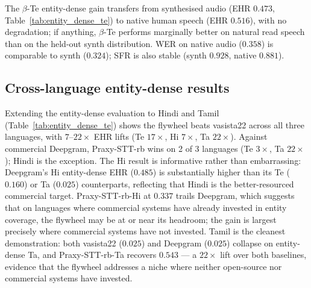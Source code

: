 \documentclass[conference,a4paper]{IEEEtran}
\begin{document}
\begin{table}[t]
\centering
\caption{Native human-recorded entity-dense Telugu sanity check ($n=20$). Bold = best per column. EHR/SFR higher is better; WER lower is better.}
\label{tab:native_sanity}
\end{table}

The $\beta$-Te entity-dense gain transfers from synthesised audio (EHR $0.473$, Table~\ref{tab:entity_dense_te}) to native human speech (EHR $0.516$), with no degradation; if anything, $\beta$-Te performs marginally better on natural read speech than on the held-out synth distribution. WER on native audio ($0.358$) is comparable to synth ($0.324$); SFR is also stable (synth $0.928$, native $0.881$).

\subsection{Cross-language entity-dense results}\label{sec:beta_xling}

Extending the entity-dense evaluation to Hindi and Tamil (Table~\ref{tab:entity_dense_te}) shows the flywheel beats vasista22 across all three languages, with $7$--$22\times$ EHR lifts (Te $17\times$, Hi $7\times$, Ta $22\times$). Against commercial Deepgram, Praxy-STT-rb wins on 2 of 3 languages (Te $3\times$, Ta $22\times$); Hindi is the exception. The Hi result is informative rather than embarrassing: Deepgram's Hi entity-dense EHR ($0.485$) is substantially higher than its Te ($0.160$) or Ta ($0.025$) counterparts, reflecting that Hindi is the better-resourced commercial target. Praxy-STT-rb-Hi at $0.337$ trails Deepgram, which suggests that on languages where commercial systems have already invested in entity coverage, the flywheel may be at or near its headroom; the gain is largest precisely where commercial systems have not invested. Tamil is the cleanest demonstration: both vasista22 ($0.025$) and Deepgram ($0.025$) collapse on entity-dense Ta, and Praxy-STT-rb-Ta recovers $0.543$ --- a $22\times$ lift over both baselines, evidence that the flywheel addresses a niche where neither open-source nor commercial systems have invested.
\end{document}
